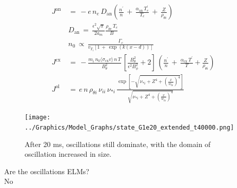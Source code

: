 \documentclass[10pt]{beamer}
\begin{document}
\begin{frame} %
\begin{align}
	J^\text{an} \,&=\, -e \, n_e \, D_\text{an} \left(\frac{n^\prime}{n}
		\,+\, \frac{\alpha_\text{an}\,T_e^\prime}{T_e} \,+\,
		\frac{Z}{\rho_{\theta i}}\right) \\
	&D_\text{an} \,=\, \frac{\epsilon^2 \sqrt{\pi}}{2 a_m}
		\frac{\rho_{\theta e} \, T_e}{B} \\
	&n_0 \,\propto\, \frac{\Gamma_c}{v_{T_i}\left[1 \,+\,
		\exp{(k(x - d))}\right]} \\
	J^\text{cx} \,&=\,
		-\frac{m_i \,n_0 \langle\sigma_\text{cx} v\rangle \, n\,T}{B_\theta^2}
		\, \left[\frac{B_\theta^2}{\epsilon^2 B_\phi^2} + 2\right] \,
		\left(\frac{n^\prime}{n} \,+\, \frac{\alpha_\text{cx}\,T^\prime}
		{T} + \frac{Z}{\rho_{\theta i}}\right) \\
	J^\text{ol} \,&=\, e \, n \, \rho_{\theta i} \, \nu_{ii} \, \nu_{*i} \,
		\frac{\exp\left[-\sqrt{\nu_{*i} + Z^4
		+ \left(\frac{x}{w_{bi}}\right)^4}\right]}{\sqrt{\nu_{*i} + Z^4
		+ \left(\frac{x}{w_{bi}}\right)^4}}
\end{align}
\end{frame}

\begin{frame} %

\begin{figure}[h]
\begin{minipage}{0.69\linewidth}
	\texttt{[image: ../Graphics/Model\_Graphs/state\_G1e20\_extended\_t40000.png]}
\end{minipage}
\begin{minipage}{0.29\linewidth}
	\caption{After 20 ms, oscillations still dominate, with the domain of oscillation increased in size.}
\end{minipage}
\end{figure}

\end{frame}

\begin{frame} %
\centering
Are the oscillations ELMs? \\
\Huge No
\end{frame}
\end{document}
